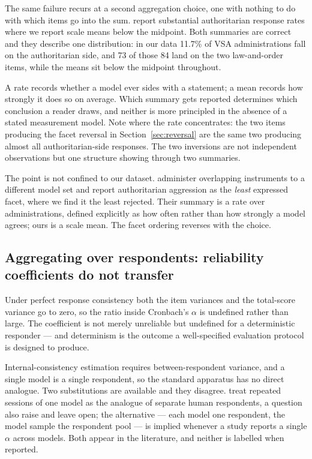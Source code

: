 \documentclass{article}
\begin{document}
The same failure recurs at a second aggregation choice, one with nothing to do with which items go into the sum. \citet{einwiller2026} report substantial authoritarian response rates where we report scale means below the midpoint. Both summaries are correct and they describe one distribution: in our data 11.7\% of VSA administrations fall on the authoritarian side, and 73 of those 84 land on the two law-and-order items, while the means sit below the midpoint throughout.

A rate records whether a model ever sides with a statement; a mean records how strongly it does so on average. Which summary gets reported determines which conclusion a reader draws, and neither is more principled in the absence of a stated measurement model. Note where the rate concentrates: the two items producing the facet reversal in Section~\ref{sec:reversal} are the same two producing almost all authoritarian-side responses. The two inversions are not independent observations but one structure showing through two summaries.

The point is not confined to our dataset. \citet{einwiller2026} administer overlapping instruments to a different model set and report authoritarian aggression as the \emph{least} expressed facet, where we find it the least rejected. Their summary is a rate over administrations, defined explicitly as how often rather than how strongly a model agrees; ours is a scale mean. The facet ordering reverses with the choice.

\subsection{Aggregating over respondents: reliability coefficients do not transfer}
\label{sec:reliability}

Under perfect response consistency both the item variances and the total-score variance go to zero, so the ratio inside Cronbach's $\alpha$ is undefined rather than large. The coefficient is not merely unreliable but undefined for a deterministic responder --- and determinism is the outcome a well-specified evaluation protocol is designed to produce.

Internal-consistency estimation requires between-respondent variance, and a single model is a single respondent, so the standard apparatus has no direct analogue. Two substitutions are available and they disagree. \citet{urban2025} treat repeated sessions of one model as the analogue of separate human respondents, a question \citet{suhr2025} also raise and leave open; the alternative --- each model one respondent, the model sample the respondent pool --- is implied whenever a study reports a single $\alpha$ across models. Both appear in the literature, and neither is labelled when reported.
\end{document}
